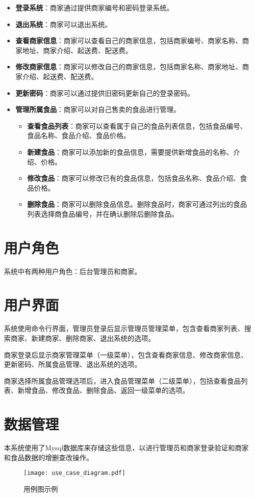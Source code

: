 \documentclass[UTF8]{ctexart}
\begin{document}
\begin{itemize}
    \item \textbf{登录系统}：商家通过提供商家编号和密码登录系统。
    \item \textbf{退出系统}：商家可以退出系统。
    \item \textbf{查看商家信息}：商家可以查看自己的商家信息，包括商家编号、商家名称、商家地址、商家介绍、起送费、配送费。
    \item \textbf{修改商家信息}：商家可以修改自己的商家信息，包括商家名称、商家地址、商家介绍、起送费、配送费。
    \item \textbf{更新密码}：商家可以通过提供旧密码更新自己的登录密码。
    \item \textbf{管理所属食品}：商家可以对自己售卖的食品进行管理。
    \begin{itemize}
        \item \textbf{查看食品列表}：商家可以查看属于自己的食品列表信息，包括食品编号、食品名称、食品介绍、食品价格。
        \item \textbf{新建食品}：商家可以添加新的食品信息，需要提供新增食品的名称、介绍、价格。
        \item \textbf{修改食品}：商家可以修改已有的食品信息，包括食品名称、食品介绍、食品价格。
        \item \textbf{删除食品}：商家可以删除食品信息。删除食品时，商家可通过列出的食品列表选择商食品编号，并在确认删除后删除食品。
    \end{itemize}
\end{itemize}

\section{用户角色}
系统中有两种用户角色：后台管理员和商家。

\section{用户界面}
系统使用命令行界面，管理员登录后显示管理员管理菜单，包含查看商家列表、搜索商家、新建商家、删除商家、退出系统的选项。

商家登录后显示商家管理菜单（一级菜单），包含查看商家信息、修改商家信息、更新密码、所属食品管理、退出系统的选项。

商家选择所属食品管理选项后，进入食品管理菜单（二级菜单），包括查看食品列表、新增食品、修改食品、删除食品、返回一级菜单的选项。

\section{数据管理}
本系统使用了Mysql数据库来存储这些信息，以进行管理员和商家登录验证和商家和食品数据的增删查改操作。


\begin{figure}[ht]
    \centering
    \texttt{[image: use\_case\_diagram.pdf]}
    \caption{用例图示例}
    \label{fig:use-case-diagram}
  \end{figure}
\end{document}
